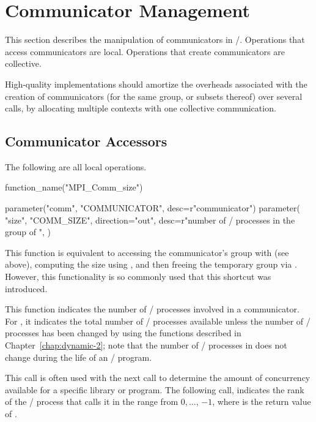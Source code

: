 \section{Communicator Management}
\label{sec:context:comm-management}

This section describes the manipulation of communicators in \MPI/.
Operations that access communicators are local.
Operations that create communicators are collective.

\begin{implementors}
High-quality implementations should
amortize the overheads associated with the creation
of communicators (for the same group, or subsets thereof)
over several calls, by allocating multiple contexts with one
collective communication.
\end{implementors}

\subsection{Communicator Accessors}
\label{subsec:context-intracommacc}

The following are all local operations.

%
\begin{mpi-binding}
    function_name("MPI_Comm_size")
    
    parameter("comm", "COMMUNICATOR", desc=r"communicator")
    parameter(
        "size",
        "COMM_SIZE",
        direction="out",
        desc=r"number of \MPI/ processes in the group of ",
    )
\end{mpi-binding}

\begin{rationale}
This function is equivalent to accessing the communicator's group with
 (see above), computing the size using
,
and then freeing the temporary group via . However,
this functionality is so commonly used that this shortcut was introduced.
\end{rationale}

\begin{users}
This function indicates the number of \MPI/ processes involved in a communicator.
For , it indicates the total number of \MPI/ processes
available unless
  the number of \MPI/ processes has been changed by using the functions
  described in Chapter~\ref{chap:dynamic-2}; note that the number of
  \MPI/ processes in  does not change during the
  life of an \MPI/ program.

This call is often used with the next call to determine the amount of
concurrency available for a specific library or program. The following
call,  indicates the rank of the \MPI/ process
that calls it in the range from $0,\ldots$, $-1$, where 
is the return value of .\end{users}


